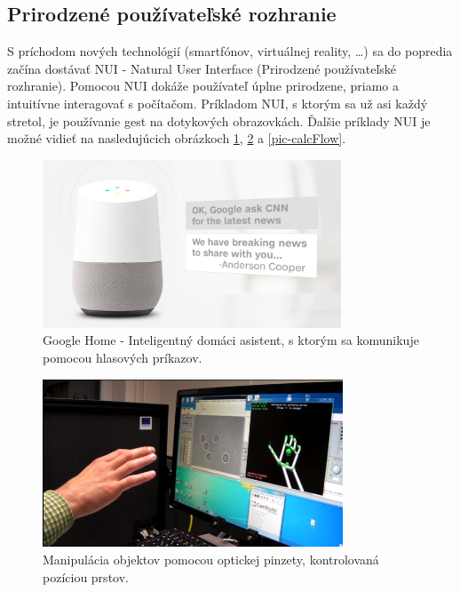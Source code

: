 \subsection{Prirodzené používateľské rozhranie}
S príchodom nových technológií (smartfónov, virtuálnej reality, \ldots) sa do popredia začína dostávať NUI - Natural User Interface (Prirodzené používateľské rozhranie).
Pomocou NUI dokáže používateľ úplne prirodzene, priamo a intuitívne interagovať s počítačom.
Príkladom NUI, s ktorým sa už asi každý stretol, je používanie gest na dotykových obrazovkách.
Ďalšie príklady NUI je možné vidieť na nasledujúcich obrázkoch \ref{pic-GoogleHome}, \ref{pic-Microrobotics} a \ref{pic-calcFlow}.

\begin{figure}[H]
	\begin{center}
		\includegraphics[height=5cm]{pics/googleHome.jpg}
		\caption{Google Home - Inteligentný domáci asistent, s ktorým sa komunikuje pomocou hlasových príkazov.
		 \cite{GoogleHome}}
		\label{pic-GoogleHome}
	\end{center}
\end{figure}

\begin{figure}[H]
	\begin{center}
		\includegraphics[height=5cm]{pics/Microrobotics.png}
			\caption{Manipulácia objektov pomocou optickej pinzety, kontrolovaná pozíciou prstov.
			\cite{Microrobotics}}
		\label{pic-Microrobotics}
	\end{center}
\end{figure}

